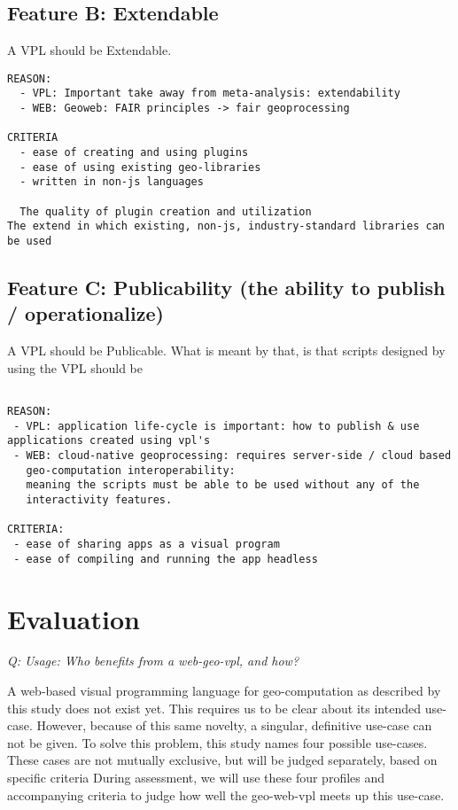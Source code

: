 \subsection*{Feature B: Extendable}

A VPL should be Extendable. 

\begin{lstlisting}
REASON: 
  - VPL: Important take away from meta-analysis: extendability
  - WEB: Geoweb: FAIR principles -> fair geoprocessing

CRITERIA
  - ease of creating and using plugins 
  - ease of using existing geo-libraries 
  - written in non-js languages

  The quality of plugin creation and utilization
The extend in which existing, non-js, industry-standard libraries can be used

\end{lstlisting}



\subsection*{Feature C: Publicability (the ability to publish / operationalize) } 

A VPL should be Publicable. What is meant by that, is that scripts designed by using the VPL should be 

\begin{lstlisting}

REASON: 
 - VPL: application life-cycle is important: how to publish & use applications created using vpl's
 - WEB: cloud-native geoprocessing: requires server-side / cloud based
   geo-computation interoperability: 
   meaning the scripts must be able to be used without any of the 
   interactivity features.

CRITERIA:
 - ease of sharing apps as a visual program
 - ease of compiling and running the app headless
\end{lstlisting}



\section{Evaluation}

\emph{Q: Usage: Who benefits from a web-geo-vpl, and how?  }

A web-based visual programming language for geo-computation as described by this study does not exist yet. 
This requires us to be clear about its intended use-case. 
However, because of this same novelty, a singular, definitive use-case can not be given.
To solve this problem, this study names four possible use-cases.  
These cases are not mutually exclusive, but will be judged separately, based on specific criteria 
During assessment, we will use these four profiles and accompanying criteria to judge how well the geo-web-vpl meets up this use-case.

